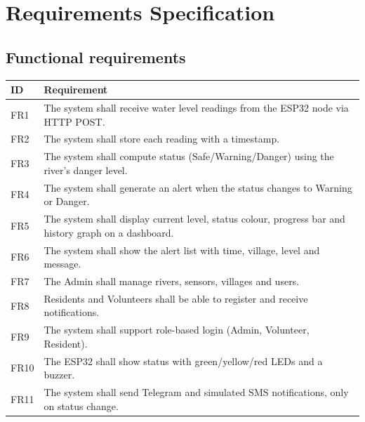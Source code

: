 \documentclass[12pt,a4paper]{article}
\begin{document}
\section{Requirements Specification}
\subsection{Functional requirements}
\begin{longtable}{@{}lp{}@{}}
\toprule\textbf{ID} & \textbf{Requirement}\\\midrule\endhead
FR1 & The system shall receive water level readings from the ESP32 node via HTTP POST.\\
FR2 & The system shall store each reading with a timestamp.\\
FR3 & The system shall compute status (Safe/Warning/Danger) using the river's danger level.\\
FR4 & The system shall generate an alert when the status changes to Warning or Danger.\\
FR5 & The system shall display current level, status colour, progress bar and history graph on a dashboard.\\
FR6 & The system shall show the alert list with time, village, level and message.\\
FR7 & The Admin shall manage rivers, sensors, villages and users.\\
FR8 & Residents and Volunteers shall be able to register and receive notifications.\\
FR9 & The system shall support role-based login (Admin, Volunteer, Resident).\\
FR10 & The ESP32 shall show status with green/yellow/red LEDs and a buzzer.\\
FR11 & The system shall send Telegram and simulated SMS notifications, only on status change.\\\bottomrule
\end{longtable}
\end{document}
